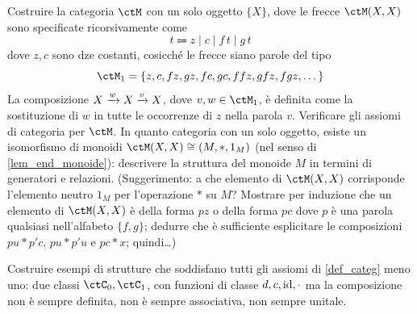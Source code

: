 \begin{esercizi}
 \item \label{jgdasoh_3} Costruire la categoria \(\ctM\) con un solo oggetto \(\{X\}\), dove le frecce \(\Hom{\ctM}(X,X)\) sono specificate ricorsivamente come
 \[t \Coloneq z \mid c \mid f \, t \mid g \, t \]
 dove \(z,c\) sono dze costanti, cosicché le frecce siano parole del tipo
 \[\ctM_1=\{z,c,fz,gz,fc,gc,ffz,gfz,fgz,\dots\}\]
 La composizione \(X \xrightarrow{w} X \xrightarrow{v} X\), dove \(v,w\in\ctM_1\), è definita come la sostituzione di \(w\) in tutte le occorrenze di \(z\) nella parola \(v\). Verificare gli assiomi di categoria per \(\ctM\). In quanto categoria con un solo oggetto, esiste un isomorfismo di monoidi \(\Hom{\ctM}(X,X) \cong (M,\ast,1_M)\) (nel senso di \ref{lem_end_monoide}): descrivere la struttura del monoide \(M\) in termini di generatori e relazioni. (Suggerimento: a che elemento di \(\Hom{\ctM}(X,X)\) corrisponde l'elemento neutro \(1_M\) per l'operazione \(*\) su \(M\)? Mostrare per induzione che un elemento di \(\Hom{\ctM}(X,X)\) è della forma \(pz\) o della forma \(pc\) dove \(p\) è una parola qualsiasi nell'alfabeto \(\{f,g\}\); dedurre che è sufficiente esplicitare le composizioni \(pu * p'c\), \(pu * p'u\) e \(pc * x\); quindi\dots)
 \item \label{jgdasoh_5} Costruire esempi di strutture che soddisfano tutti gli assiomi di \ref{def_categ} meno uno: due classi \(\ctC_0,\ctC_1\), con funzioni di classe \(d,c,\mathrm{id},\cdot\) ma la composizione non è sempre definita, non è sempre associativa, non sempre unitale.
\end{esercizi}
